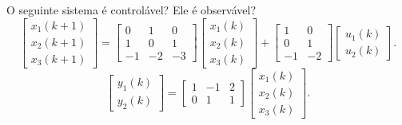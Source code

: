 \begin{question}
  O seguinte sistema é controlável? Ele é observável?
  \[
    \begin{bmatrix}
      x_1(k+1) \\
      x_2(k+1) \\
      x_3(k+1)
    \end{bmatrix}
    =
    \begin{bmatrix}
      0  & 1  & 0  \\
      1  & 0  & 1  \\
      -1 & -2 & -3
    \end{bmatrix}
    \begin{bmatrix}
      x_1(k) \\
      x_2(k) \\
      x_3(k)
    \end{bmatrix}
    +
    \begin{bmatrix}
      1  & 0  \\
      0  & 1  \\
      -1 & -2
    \end{bmatrix}
    \begin{bmatrix}
      u_1(k) \\
      u_2(k)
    \end{bmatrix}.
  \]
  \[
    \begin{bmatrix}
      y_1(k) \\
      y_2(k)
    \end{bmatrix}
    =
    \begin{bmatrix}
      1 & -1 & 2 \\
      0 & 1  & 1
    \end{bmatrix}
    \begin{bmatrix}
      x_1(k) \\
      x_2(k) \\
      x_3(k)
    \end{bmatrix}.
  \]
\end{question}

